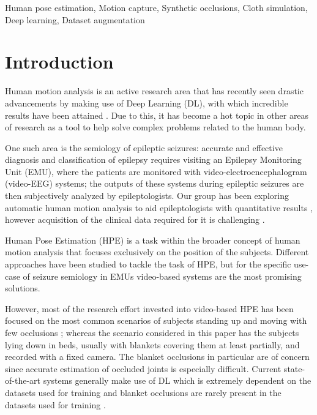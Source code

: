 \documentclass[conference]{IEEEtran}
\begin{document}
\begin{IEEEkeywords}
Human pose estimation, Motion capture, Synthetic occlusions, Cloth simulation, Deep learning, Dataset augmentation
\end{IEEEkeywords}

\section{Introduction}
\label{sec:intro}

Human motion analysis is an active research area that has recently seen drastic advancements by making use of Deep Learning (DL), with which incredible results have been attained \cite{DLHPEreview}. Due to this, it has become a hot topic in other areas of research as a tool to help solve complex problems related to the human body.

One such area is the semiology of epileptic seizures: accurate and effective diagnosis and classification of epilepsy requires visiting an Epilepsy Monitoring Unit (EMU), where the patients are monitored with video-electroencephalogram (video-EEG) systems; the outputs of these systems during epileptic seizures are then subjectively analyzed by epileptologists. Our group has been exploring automatic human motion analysis to aid epileptologists with quantitative results \cite{karacsonyClassification2020, neurokinect, karacsonyNature}, however acquisition of the clinical data required for it is challenging \cite{deepepil}.

Human Pose Estimation (HPE) is a task within the broader concept of human motion analysis that focuses exclusively on the position of the subjects. Different approaches have been studied to tackle the task of HPE, but for the specific use-case of seizure semiology in EMUs video-based systems are the most promising solutions.

However, most of the research effort invested into video-based HPE has been focused on the most common scenarios of subjects standing up and moving with few occlusions \cite{hpereview2021}; whereas the scenario considered in this paper has the subjects lying down in beds, usually with blankets covering them at least partially, and recorded with a fixed camera. The blanket occlusions in particular are of concern since accurate estimation of occluded joints is especially difficult. Current state-of-the-art systems generally make use of DL which is extremely dependent on the datasets used for training and blanket occlusions are rarely present in the datasets used for training \cite{hpereview2021}.
\end{document}
